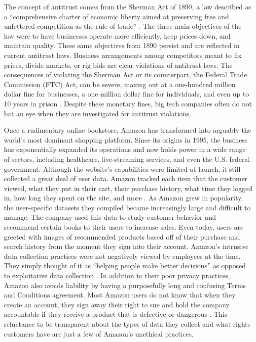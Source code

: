 \documentclass[twoside]{article}
\begin{document}
The concept of antitrust comes from the Sherman Act of 1890, a law described as a “comprehensive charter of economic liberty aimed at preserving free and unfettered competition as the rule of trade'' \cite{ftc}. The three main objectives of the law were to have businesses operate more efficiently, keep prices down, and maintain quality. These same objectives from 1890 persist and are reflected in current antitrust laws. Business arrangements among competitors meant to fix prices, divide markets, or rig bids are clear violations of antitrust laws. The consequences of violating the Sherman Act or its counterpart, the Federal Trade Commission (FTC) Act, can be severe, maxing out at a one-hundred million dollar fine for businesses, a one million dollar fine for individuals, and even up to 10 years in prison \cite{ftc}. Despite these monetary fines, big tech companies often do not bat an eye when they are investigated for antitrust violations. 

Once a rudimentary online bookstore, Amazon has transformed into arguably the world's most dominant shopping platform. Since its origins in 1995, the business has exponentially expanded its operations and now holds power in a wide range of sectors, including healthcare, live-streaming services, and even the U.S. federal government. Although the website's capabilities were limited at launch, it still collected a great deal of user data. Amazon tracked each item that the customer viewed, what they put in their cart, their purchase history, what time they logged in, how long they spent on the site, and more \cite{amazon1}. As Amazon grew in popularity, the user-specific datasets they compiled became increasingly large and difficult to manage. The company used this data to study customer behavior and recommend certain books to their users to increase sales. Even today, users are greeted with images of recommended products based off of their purchase and search history from the moment they sign into their account. Amazon's intrusive data collection practices were not negatively viewed by employees at the time. They simply thought of it as “helping people make better decisions” as opposed to exploitative data collection \cite{amazon1}. In addition to their poor privacy practices, Amazon also avoids liability by having a purposefully long and confusing Terms and Conditions agreement. Most Amazon users do not know that when they create an account, they sign away their right to sue and hold the company accountable if they receive a product that is defective or dangerous \cite{amazon1}. This reluctance to be transparent about the types of data they collect and what rights customers have are just a few of Amazon's unethical practices.
\end{document}
